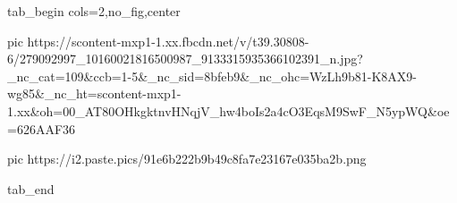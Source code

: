  
 
 
 
 

\ifcmt
  tab_begin cols=2,no_fig,center

     pic https://scontent-mxp1-1.xx.fbcdn.net/v/t39.30808-6/279092997_10160021816500987_9133315935366102391_n.jpg?_nc_cat=109&ccb=1-5&_nc_sid=8bfeb9&_nc_ohc=WzLh9b81-K8AX9-wg85&_nc_ht=scontent-mxp1-1.xx&oh=00_AT80OHkgktnvHNqjV_hw4boIs2a4cO3EqsM9SwF_N5ypWQ&oe=626AAF36

		 pic https://i2.paste.pics/91e6b222b9b49c8fa7e23167e035ba2b.png

  tab_end
\fi
